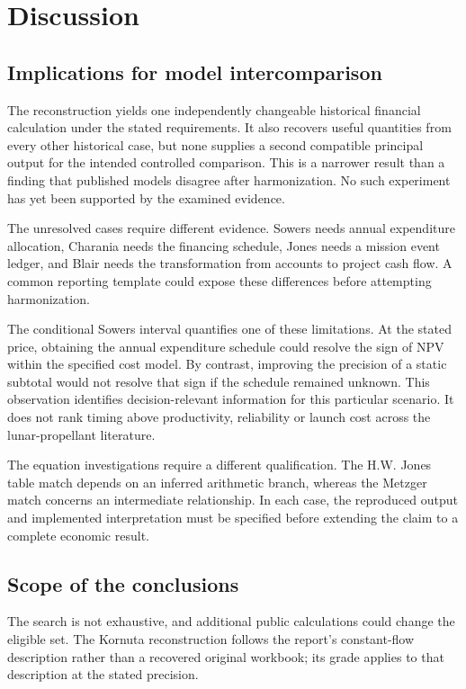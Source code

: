 \documentclass[final,5p,times,twocolumn]{elsarticle}
\begin{document}
\section{Discussion}
\subsection{Implications for model intercomparison}
The reconstruction yields one independently changeable historical financial calculation under the stated requirements. It also recovers useful quantities from every other historical case, but none supplies a second compatible principal output for the intended controlled comparison. This is a narrower result than a finding that published models disagree after harmonization. No such experiment has yet been supported by the examined evidence.

The unresolved cases require different evidence. Sowers needs annual expenditure allocation, Charania needs the financing schedule, Jones needs a mission event ledger, and Blair needs the transformation from accounts to project cash flow. A common reporting template could expose these differences before attempting harmonization.

The conditional Sowers interval quantifies one of these limitations. At the stated price, obtaining the annual expenditure schedule could resolve the sign of NPV within the specified cost model. By contrast, improving the precision of a static subtotal would not resolve that sign if the schedule remained unknown. This observation identifies decision-relevant information for this particular scenario. It does not rank timing above productivity, reliability or launch cost across the lunar-propellant literature.

The equation investigations require a different qualification. The H.W. Jones table match depends on an inferred arithmetic branch, whereas the Metzger match concerns an intermediate relationship. In each case, the reproduced output and implemented interpretation must be specified before extending the claim to a complete economic result.

\subsection{Scope of the conclusions}
The search is not exhaustive, and additional public calculations could change the eligible set. The Kornuta reconstruction follows the report's constant-flow description rather than a recovered original workbook; its grade applies to that description at the stated precision.
\end{document}
